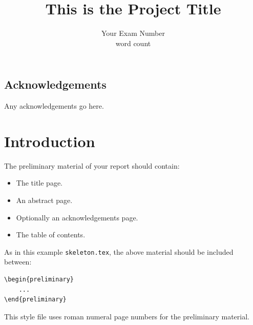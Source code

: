 \documentclass[msc,deptreport,slp]{infthesis} %
\begin{document}
\begin{preliminary}

\title{This is the Project Title}

\author{Your Exam Number\\word count}


\maketitle

\section*{Acknowledgements}
Any acknowledgements go here. 

\tableofcontents
\end{preliminary}


\chapter{Introduction}

The preliminary material of your report should contain:
\begin{itemize}
\item
The title page.
\item
An abstract page.
\item
Optionally an acknowledgements page.
\item
The table of contents.
\end{itemize}

As in this example \texttt{skeleton.tex}, the above material should be
included between:
\begin{verbatim}
\begin{preliminary}
    ...
\end{preliminary}
\end{verbatim}
This style file uses roman numeral page numbers for the preliminary material.
\end{document}
